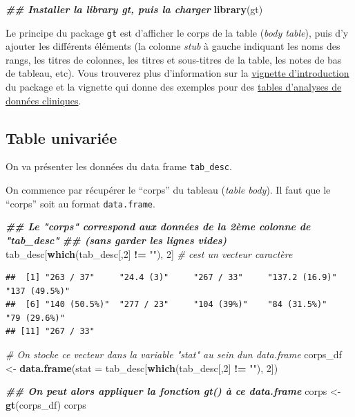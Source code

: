 \documentclass[
]{book}
\newenvironment{Shaded}{\begin{snugshade}}{\end{snugshade}}
\newcommand{\AttributeTok}[1]{\textcolor[rgb]{0.13,0.29,0.53}{#1}}
\newcommand{\CommentTok}[1]{\textcolor[rgb]{0.56,0.35,0.01}{\textit{#1}}}
\newcommand{\DecValTok}[1]{\textcolor[rgb]{0.00,0.00,0.81}{#1}}
\newcommand{\DocumentationTok}[1]{\textcolor[rgb]{0.56,0.35,0.01}{\textbf{\textit{#1}}}}
\newcommand{\FunctionTok}[1]{\textcolor[rgb]{0.13,0.29,0.53}{\textbf{#1}}}
\newcommand{\NormalTok}[1]{#1}
\newcommand{\OtherTok}[1]{\textcolor[rgb]{0.56,0.35,0.01}{#1}}
\newcommand{\SpecialCharTok}[1]{\textcolor[rgb]{0.81,0.36,0.00}{\textbf{#1}}}
\newcommand{\StringTok}[1]{\textcolor[rgb]{0.31,0.60,0.02}{#1}}
\begin{document}
\begin{Shaded}
\begin{Highlighting}[]
\DocumentationTok{\#\# Installer la library gt, puis la charger}
\FunctionTok{library}\NormalTok{(gt)}
\end{Highlighting}
\end{Shaded}

Le principe du package \texttt{gt} est d'afficher le corps de la table (\emph{body table}), puis d'y ajouter les différents éléments (la colonne \emph{stub} à gauche indiquant les noms des rangs, les titres de colonnes, les titres et sous-titres de la table, les notes de bas de tableau, etc). Vous trouverez plus d'information sur la \href{https://gt.rstudio.com/articles/gt.html}{vignette d'introduction} du package et la vignette qui donne des exemples pour des \href{https://gt.rstudio.com/articles/case-study-clinical-tables.html}{tables d'analyses de données cliniques}.

\subsection{Table univariée}\label{table-univariuxe9e}

On va présenter les données du data frame \texttt{tab\_desc}.

On commence par récupérer le ``corps'' du tableau (\emph{table body}). Il faut que le ``corps'' soit au format \texttt{data.frame}.

\begin{Shaded}
\begin{Highlighting}[]
\DocumentationTok{\#\# Le "corps" correspond aux données de la 2ème colonne de "tab\_desc"}
\DocumentationTok{\#\# (sans garder les lignes vides)}
\NormalTok{tab\_desc[}\FunctionTok{which}\NormalTok{(tab\_desc[,}\DecValTok{2}\NormalTok{] }\SpecialCharTok{!=} \StringTok{""}\NormalTok{), }\DecValTok{2}\NormalTok{] }\CommentTok{\# c\textquotesingle{}est un vecteur caractère}
\end{Highlighting}
\end{Shaded}

\begin{verbatim}
##  [1] "263 / 37"     "24.4 (3)"     "267 / 33"     "137.2 (16.9)" "137 (49.5%)" 
##  [6] "140 (50.5%)"  "277 / 23"     "104 (39%)"    "84 (31.5%)"   "79 (29.6%)"  
## [11] "267 / 33"
\end{verbatim}

\begin{Shaded}
\begin{Highlighting}[]
\CommentTok{\# On stocke ce vecteur dans la variable "stat" au sein d\textquotesingle{}un data.frame}
\NormalTok{corps\_df }\OtherTok{\textless{}{-}} \FunctionTok{data.frame}\NormalTok{(}\AttributeTok{stat =}\NormalTok{ tab\_desc[}\FunctionTok{which}\NormalTok{(tab\_desc[,}\DecValTok{2}\NormalTok{] }\SpecialCharTok{!=} \StringTok{""}\NormalTok{), }\DecValTok{2}\NormalTok{])}

\DocumentationTok{\#\# On peut alors appliquer la fonction gt() à ce data.frame}
\NormalTok{corps }\OtherTok{\textless{}{-}} \FunctionTok{gt}\NormalTok{(corps\_df)}
\NormalTok{corps}
\end{Highlighting}
\end{Shaded}
\end{document}
